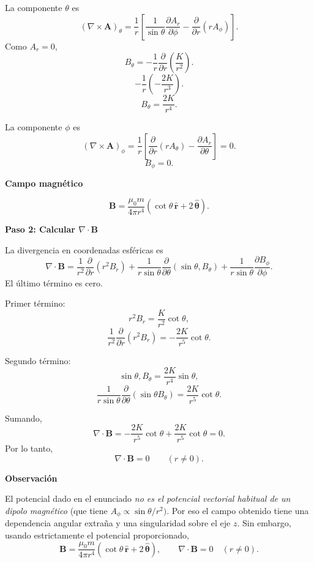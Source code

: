 \documentclass[11pt,spanish]{article}
\begin{document}
La componente $\theta$ es
$$
(\nabla\times\mathbf A)_\theta
=
\frac1r
\left[
\frac1{\sin\theta}
\frac{\partial A_r}{\partial\phi}
-
\frac{\partial}{\partial r}(rA_\phi)
\right].
$$
Como $A_r=0$,
$$
B_\theta
=
-\frac1r
\frac{\partial}{\partial r}
\left(
\frac{K}{r^2}
\right).
$$
$$
-\frac1r
\left(
-\frac{2K}{r^3}
\right).
$$
$$
\boxed{
B_\theta
=
\frac{2K}{r^4}.
}
$$

La componente $\phi$ es
$$
(\nabla\times\mathbf A)_\phi
=
\frac1r
\left[
\frac{\partial}{\partial r}(rA_\theta)
-
\frac{\partial A_r}{\partial\theta}
\right]
=0.
$$
$$
\boxed{B_\phi=0.}
$$

{\bf Campo magnético}

$$
\boxed{
\mathbf B
=
\frac{\mu_0 m}{4\pi r^4}
\left(
\cot\theta\,\hat{\mathbf r}
+
2\,\hat{\boldsymbol\theta}
\right).
}
$$

{\bf Paso 2: Calcular $\nabla\cdot\mathbf B$}

La divergencia en coordenadas esféricas es
$$
\nabla\cdot\mathbf B
=
\frac1{r^2}
\frac{\partial}{\partial r}
(r^2B_r)
+
\frac1{r\sin\theta}
\frac{\partial}{\partial\theta}
(\sin\theta,B_\theta)
+
\frac1{r\sin\theta}
\frac{\partial B_\phi}{\partial\phi}.
$$
El último término es cero.

Primer término:
$$
r^2B_r
=
\frac{K}{r^2}\cot\theta,
$$
$$
\frac1{r^2}
\frac{\partial}{\partial r}
(r^2B_r)
=
-\frac{2K}{r^5}\cot\theta.
$$

Segundo término:
$$
\sin\theta,B_\theta
=
\frac{2K}{r^4}\sin\theta,
$$
$$
\frac1{r\sin\theta}
\frac{\partial}{\partial\theta}
(\sin\theta B_\theta)
=
\frac{2K}{r^5}\cot\theta.
$$

Sumando,
$$
\nabla\cdot\mathbf B
=
-\frac{2K}{r^5}\cot\theta
+
\frac{2K}{r^5}\cot\theta
=
0.
$$
Por lo tanto,
$$
\boxed{
\nabla\cdot\mathbf B=0
\qquad (r\neq0).
}
$$

{\bf Observación}

El potencial dado en el enunciado {\em no es el potencial vectorial habitual de un dipolo magnético} (que tiene $A_\phi\propto \sin\theta/r^2)$. 
Por eso el campo obtenido tiene una dependencia angular extraña y una singularidad sobre el eje $z$.
Sin embargo, usando estrictamente el potencial proporcionado,
$$
\boxed{
\mathbf B
=
\frac{\mu_0 m}{4\pi r^4}
\left(
\cot\theta\,\hat{\mathbf r}
+
2\,\hat{\boldsymbol\theta}
\right),
\qquad
\nabla\cdot\mathbf B=0
\quad (r\neq0).
}
$$
 
%
%
\end{document}
